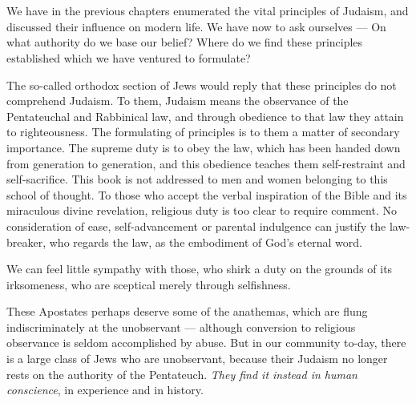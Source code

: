 \chapter{}

We have in the previous chapters enumerated
the vital principles of Judaism, and
discussed their influence on modern life.
We have now to ask ourselves — On what
authority do we base our belief? Where
do we find these principles established which
we have ventured to formulate?

The so-called orthodox section of Jews
would reply that these principles do not
comprehend Judaism. To them, Judaism
means the observance of the Pentateuchal
and Rabbinical law, and through obedience
to that law they attain to righteousness.
The formulating of principles is to them
a matter of secondary importance. The
supreme duty is to obey the law, which
has been handed down from generation to
generation, and this obedience teaches them
self-restraint and self-sacrifice. This book
is not addressed to men and women belonging
to this school of thought. To those
who accept the verbal inspiration of the
Bible and its miraculous divine revelation,
religious duty is too clear to require comment.
No consideration of ease, self-advancement
or parental indulgence can
justify the law-breaker, who regards the law,
as the embodiment of God's eternal word.

We can feel little sympathy with those,
who shirk a duty on the grounds of its irksomeness,
who are sceptical merely through
selfishness.

These Apostates perhaps deserve some of
the anathemas, which are flung indiscriminately
at the unobservant — although conversion
to religious observance is seldom
accomplished by abuse. But in our community
to-day, there is a large class of Jews
who are unobservant, because their Judaism
no longer rests on the authority of the
Pentateuch. \textsl{They find it instead in human
conscience}, in experience and in history.

